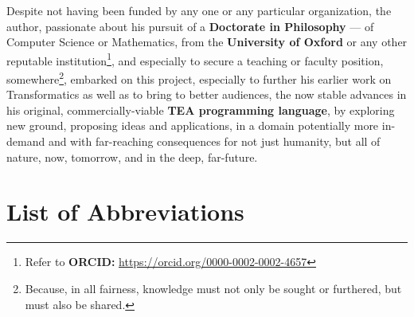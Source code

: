 \documentclass[a4paper, 18pt]{book} %
\begin{document}
Despite not having been funded by any one or any particular organization, the author, passionate about his pursuit of a \textbf{Doctorate in Philosophy} --- of Computer Science or Mathematics, from the \textbf{University of Oxford}\cite{lutalo_2025_sop}\cite{Lutalo2025_phd} or any other reputable institution\footnote{Refer to \textbf{ORCID:} \url{https://orcid.org/0000-0002-0002-4657}}, and especially to secure a teaching or faculty position, somewhere\footnote{Because, in all fairness, knowledge must not only be sought or furthered, but must also be shared.}, embarked on this project, especially to further his earlier work on Transformatics\cite{transformatics} as well as to bring to better audiences, the now stable advances in his original, commercially-viable \textbf{TEA programming language}\cite{cli_tttt}, by exploring new ground, proposing ideas and applications, in a domain potentially more in-demand and with far-reaching consequences for not just humanity, but all of nature, now, tomorrow, and in the deep, far-future. 



\chapter*{List of Abbreviations}
\end{document}

